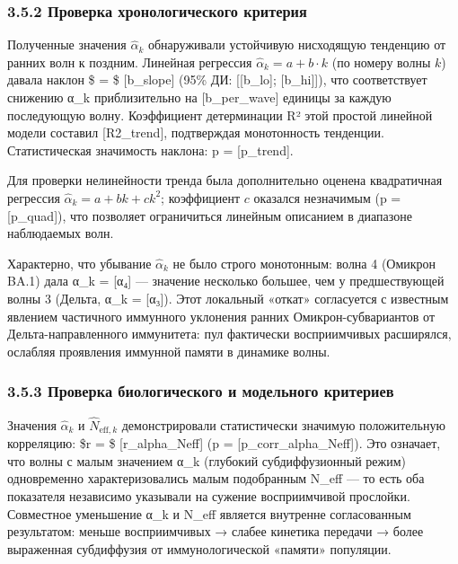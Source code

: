 \documentclass[12pt]{article}
\begin{document}
\subsubsection{3.5.2 Проверка хронологического
критерия}\label{ux43fux440ux43eux432ux435ux440ux43aux430-ux445ux440ux43eux43dux43eux43bux43eux433ux438ux447ux435ux441ux43aux43eux433ux43e-ux43aux440ux438ux442ux435ux440ux438ux44f}

Полученные значения \(\hat{\alpha}_k\) обнаруживали устойчивую
нисходящую тенденцию от ранних волн к поздним. Линейная регрессия
\(\hat{\alpha}_k = a + b \cdot k\) (по номеру волны \(k\)) давала наклон
\$ = \$ {[}b\_slope{]} (95\% ДИ: {[}{[}b\_lo{]}; {[}b\_hi{]}{]}),
что соответствует снижению α\_k приблизительно на {[}b\_per\_wave{]}
единицы за каждую последующую волну. Коэффициент детерминации R² этой
простой линейной модели составил {[}R2\_trend{]}, подтверждая
монотонность тенденции. Статистическая значимость наклона: p =
{[}p\_trend{]}.

Для проверки нелинейности тренда была дополнительно оценена квадратичная
регрессия \(\hat{\alpha}_k = a + bk + ck^2\); коэффициент \(c\) оказался
незначимым (p = {[}p\_quad{]}), что позволяет ограничиться линейным
описанием в диапазоне наблюдаемых волн.

Характерно, что убывание \(\hat{\alpha}_k\) не было строго монотонным:
волна 4 (Омикрон BA.1) дала α\_k = {[}α₄{]} --- значение несколько
большее, чем у предшествующей волны 3 (Дельта, α\_k = {[}α₃{]}). Этот
локальный «откат» согласуется с известным явлением частичного иммунного
уклонения ранних Омикрон-субвариантов от Дельта-направленного
иммунитета: пул фактически восприимчивых расширялся, ослабляя проявления
иммунной памяти в динамике волны.

\subsubsection{3.5.3 Проверка биологического и модельного
критериев}\label{ux43fux440ux43eux432ux435ux440ux43aux430-ux431ux438ux43eux43bux43eux433ux438ux447ux435ux441ux43aux43eux433ux43e-ux438-ux43cux43eux434ux435ux43bux44cux43dux43eux433ux43e-ux43aux440ux438ux442ux435ux440ux438ux435ux432}

Значения \(\hat{\alpha}_k\) и \(\hat{N}_{\text{eff},k}\) демонстрировали
статистически значимую положительную корреляцию: \$r = \$
{[}r\_alpha\_Neff{]} (p = {[}p\_corr\_alpha\_Neff{]}). Это означает, что
волны с малым значением α\_k (глубокий субдиффузионный режим)
одновременно характеризовались малым подобранным N\_eff --- то есть оба
показателя независимо указывали на сужение восприимчивой прослойки.
Совместное уменьшение α\_k и N\_eff является внутренне согласованным
результатом: меньше восприимчивых → слабее кинетика передачи → более
выраженная субдиффузия от иммунологической «памяти» популяции.
\end{document}
